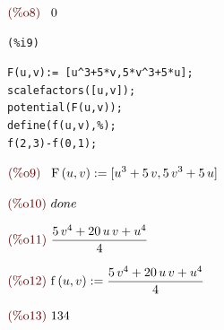 \documentclass[12pt]{article}
\begin{document}
\begin{math}\displaystyle
\parbox{8ex}{\color{labelcolor}(\%o8) }
0
\end{math}


\noindent
\begin{minipage}[t]{8ex}{\color{red}\bf
\begin{verbatim}
(%i9) 
\end{verbatim}}
\end{minipage}
\begin{minipage}[t]{\textwidth}{\color{blue}
\begin{verbatim}
F(u,v):= [u^3+5*v,5*v^3+5*u];
scalefactors([u,v]);
potential(F(u,v));
define(f(u,v),%);
f(2,3)-f(0,1);
\end{verbatim}}
\end{minipage}
\begin{math}\displaystyle
\parbox{8ex}{\color{labelcolor}(\%o9) }
\mathrm{F}\left( u,v\right) :=[{u}^{3}+5\,v,5\,{v}^{3}+5\,u]
\end{math}

\begin{math}\displaystyle
\parbox{8ex}{\color{labelcolor}(\%o10) }
done
\end{math}

\begin{math}\displaystyle
\parbox{8ex}{\color{labelcolor}(\%o11) }
\frac{5\,{v}^{4}+20\,u\,v+{u}^{4}}{4}
\end{math}

\begin{math}\displaystyle
\parbox{8ex}{\color{labelcolor}(\%o12) }
\mathrm{f}\left( u,v\right) :=\frac{5\,{v}^{4}+20\,u\,v+{u}^{4}}{4}
\end{math}

\begin{math}\displaystyle
\parbox{8ex}{\color{labelcolor}(\%o13) }
134
\end{math}
\end{document}
